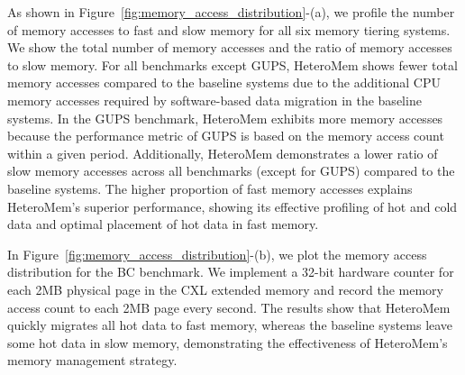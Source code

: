 As shown in Figure~\ref{fig:memory_access_distribution}-(a), we profile the number of memory accesses to fast and slow memory for all six memory tiering systems. 
We show the total number of memory accesses and the ratio of memory accesses to slow memory.
For all benchmarks except GUPS, HeteroMem shows fewer total memory accesses compared to the baseline systems due to the additional CPU memory accesses required by software-based data migration in the baseline systems. In the GUPS benchmark, HeteroMem exhibits more memory accesses because the performance metric of GUPS is based on the memory access count within a given period.
Additionally, HeteroMem demonstrates a lower ratio of slow memory accesses across all benchmarks (except for GUPS) compared to the baseline systems. 
The higher proportion of fast memory accesses explains HeteroMem's superior  performance, showing its effective profiling of hot and cold data and optimal placement of hot data in fast memory.

In Figure~\ref{fig:memory_access_distribution}-(b), we plot the memory access distribution for the BC benchmark. We implement a 32-bit hardware counter for each 2MB physical page in the CXL extended memory and record the memory access count to each 2MB page every second. The results show that HeteroMem quickly migrates all hot data to fast memory, whereas the baseline systems leave some hot data in slow memory, demonstrating the effectiveness of HeteroMem's memory management strategy.

